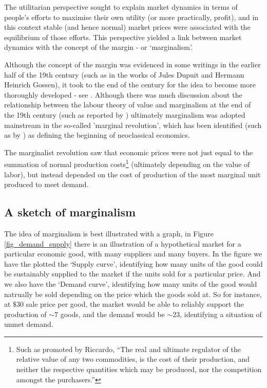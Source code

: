 The utilitarian perspective sought to explain market dynamics in terms of people's efforts to maximise their own utility (or more practically, profit), and in this context stable (and hence normal) market prices were associated with the equilibrium of those efforts.
This perspective yielded a link between market dynamics with the concept of the margin - or `marginalism'.

Although the concept of the margin was evidenced in some writings in the earlier half of the 19th century (such as in the works of Jules Dupuit and Hermann Heinrich Gossen), it took to the end of the century for the idea to become more thoroughly developed - see \cite{RePEc:ucp:jpolec:v:58:y:1950:p:307}.
Although there was much discussion about the relationship between the labour theory of value and marginalism at the end of the 19th century (such as reported by \cite{steedman2003socialism}) ultimately marginalism was adopted mainstream in the so-called 'marginal revolution', which has been identified (such as by \cite{marginalism1}) as defining the beginning of neoclassical economics.

The marginalist revolution saw that economic prices were not just equal to the summation of normal production costs\footnote{Such as promoted by Riccardo, ``The real and ultimate regulator of the relative value of any two commodities, is the cost of their production, and neither the respective quantities which may be produced, nor the competition amongst the purchasers.''\cite{Riccardo1Gutenberg}} (ultimately depending on the value of labor), but instead depended on the cost of production of the most marginal unit produced to meet demand.

\subsection{A sketch of marginalism}\label{subsec:marginal_price_sketch}

The idea of marginalism is best illustrated with a graph, in Figure \ref{fig_demand_supply} there is an illustration of a hypothetical market for a particular economic good, with many suppliers and many buyers.
In the figure we have the plotted the `Supply curve', identifying how many units of the good could be sustainably supplied to the market if the units sold for a particular price.
And we also have the `Demand curve', identifying how many units of the good would natrually be sold depending on the price which the goods sold at.
So for instance, at $\$30$ sale price per good, the market would be able to reliably support the production of $\sim 7$ goods, and the demand would be $\sim 23$, identifying a situation of unmet demand.

